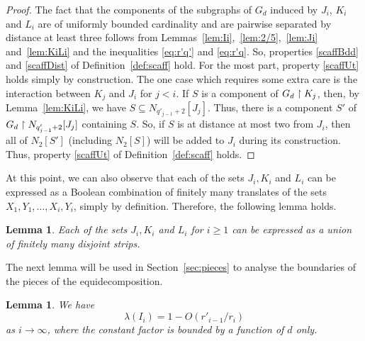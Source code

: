 \documentclass[12pt,a4paper]{amsart}
\numberwithin{equation}{section}
\newtheorem{lemma}[equation]{Lemma}
\theoremstyle{definition}
\begin{document}
\begin{proof}
The fact that the components of the subgraphs of $G_d$ induced by $J_i$, $K_i$ and $L_i$ are of uniformly bounded cardinality and are pairwise separated by distance at least three follows from Lemmas~\ref{lem:Ii},~\ref{lem:2/5},~\ref{lem:Ji} and~\ref{lem:KiLi} and the inequalities \eqref{eq:r'q'} and \eqref{eq:r'q}.  So, properties \eqref{scaffBdd} and \eqref{scaffDist} of Definition~\ref{def:scaff} hold. For the most part, property \eqref{scaffUt} holds simply by construction. The one case which requires some extra care is the interaction between $K_j$ and $J_i$ for $j<i$. If $S$ is a component of $G_d\upharpoonright K_j$, then, by Lemma~\ref{lem:KiLi}, we have $S\subseteq N_{q'_{j-1}+2}[J_j]$. Thus, there is a component $S'$ of $G_d\upharpoonright N_{q'_{j-1}+2}[J_j]$ containing $S$. So, if $S$ is at distance at most two from $J_i$, then all of $N_2[S']$ (including $N_2[S]$) will be added to $J_i$ during its construction. Thus, property \eqref{scaffUt} of Definition~\ref{def:scaff} holds. 
\end{proof}

At this point, we can also observe that each of the sets $J_i,K_i$ and $L_i$ can be expressed as a Boolean combination of finitely many translates of the sets $X_1,Y_1,\dots,X_i,Y_i$, simply by definition. Therefore, the following lemma holds.

\begin{lemma}
\label{lem:JKLstrips}
Each of the sets $J_i,K_i$ and $L_i$ for $i\geq1$ can be expressed as a union of finitely many disjoint strips. 
\end{lemma}


The next lemma will be used in Section~\ref{sec:pieces} to analyse the boundaries of the pieces of the equidecomposition. 

\begin{lemma}
\label{lem:Jmeas}
We have
\[\lambda(I_{i}) = 1 - O\left(r'_{i-1}/r_i\right)\]
as $i\to\infty$, where the constant factor is bounded by a function of $d$ only. 
\end{lemma}
\end{document}
